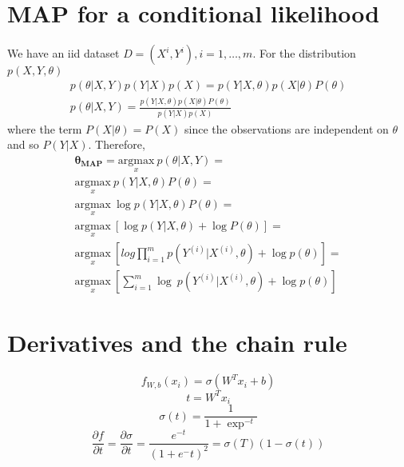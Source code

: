 \documentclass[12pt]{article}
\begin{document}
\section{MAP for a conditional likelihood}

We have an iid dataset $D = {(X^i,Y^i),i = 1,\dots, m}$. For the distribution $p(X,Y,\theta)$
\begin{equation}
\begin{array}{l}
p(\theta|X,Y)p(Y|X)p(X) = p(Y|X,\theta)p(X|\theta)P(\theta) \\
p(\theta | X,Y) = \frac{p(Y|X,\theta)p(X|\theta)P(\theta)}{p(Y|X)p(X)}
\end{array}
\end{equation}	
where the term $P(X|\theta) = P(X)$ since the observations are independent on $\theta$ and so $P(Y|X)$. Therefore,
\begin{equation}
\begin{array}{l}
\mathbf{\theta_{MAP}} = 
\underset{x}{\mathrm{argmax}}~p(\theta|X,Y) = \\
\underset{x}{\mathrm{argmax}}~p(Y|X,\theta)P(\theta) = \\
\underset{x}{\mathrm{argmax}}~\log p(Y|X,\theta)P(\theta) = \\
\underset{x}{\mathrm{argmax}}~[\log p(Y|X,\theta) + \log P(\theta)] = \\
\underset{x}{\mathrm{argmax}}~[log \prod_{i=1}^{m}p(Y^{(i)} | X^{(i)},\theta) + \log p(\theta)] = \\
\underset{x}{\mathrm{argmax}}~[\sum_{i=1}^{m}\log~p(Y^{(i)} | X^{(i)}, \theta) + \log p(\theta)] 
\end{array}
\end{equation}

\section{Derivatives and the chain rule}
\begin{equation}
f_{W,b}(x_i) = \sigma(W^Tx_i + b)
\end{equation}
\begin{equation}
t = W^Tx_i
\end{equation}
\begin{equation}
\sigma(t) = \frac{1}{1+\exp^{-t}}
\end{equation}
\begin{equation}
\frac{\partial{f}}{\partial{t}} = \frac{\partial{\sigma}}{\partial{t}} = \frac{e^{-t}}{(1+e^-t)^2} = \sigma(T)(1-\sigma(t))
\end{equation}
\end{document}
